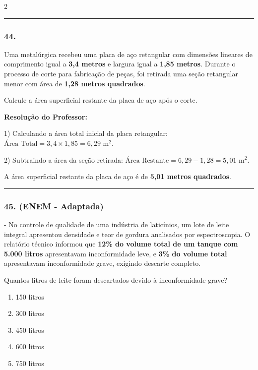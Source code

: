 \begin{multicols*}{2}
\noindent\textcolor{CorLinha}{\rule{\linewidth}{0.5pt}} 
\par\vspace{\espacoPreQuestao}
\subsubsection*{44.} Uma metalúrgica recebeu uma placa de aço retangular com dimensões lineares de comprimento igual a \textbf{3,4 metros} e largura igual a \textbf{1,85 metros}. Durante o processo de corte para fabricação de peças, foi retirada uma seção retangular menor com área de \textbf{1,28 metros quadrados}.

Calcule a área superficial restante da placa de aço após o corte.

\ifgabarito
    \begin{tcolorbox}[colback=CorTitUm!5, colframe=CorTitUm, boxrule=1pt, arc=4pt, left=6pt, right=6pt, top=6pt, bottom=6pt]
    \small\textbf{\textcolor{CorTitUm}{Resolução do Professor:}}\par\vspace{0.1cm}
    \color{CinzaEscuro}
    1) Calculando a área total inicial da placa retangular:
    $\text{Área Total} = 3,4 \times 1,85 = 6,29\text{ m}^2$.
    
    2) Subtraindo a área da seção retirada:
    $\text{Área Restante} = 6,29 - 1,28 = 5,01\text{ m}^2$.
    
    A área superficial restante da placa de aço é de \textbf{5,01 metros quadrados}.
    \end{tcolorbox}
\fi

\par\vspace{\espacoQuestao}

\noindent\textcolor{CorLinha}{\rule{\linewidth}{0.5pt}} 
\par\vspace{\espacoPreQuestao}
\subsubsection*{45. (ENEM - Adaptada)} - No controle de qualidade de uma indústria de laticínios, um lote de leite integral apresentou densidade e teor de gordura analisados por espectroscopia. O relatório técnico informou que \textbf{12\% do volume total de um tanque com 5.000 litros} apresentavam inconformidade leve, e \textbf{3\% do volume total} apresentavam inconformidade grave, exigindo descarte completo.

Quantos litros de leite foram descartados devido à inconformidade grave?
\begin{enumerate}[label=\alph*), itemsep=\espacoAlt]
    \item 150 litros
    \item 300 litros
    \item 450 litros
    \item 600 litros
    \item 750 litros
\end{enumerate}


\end{multicols*}

